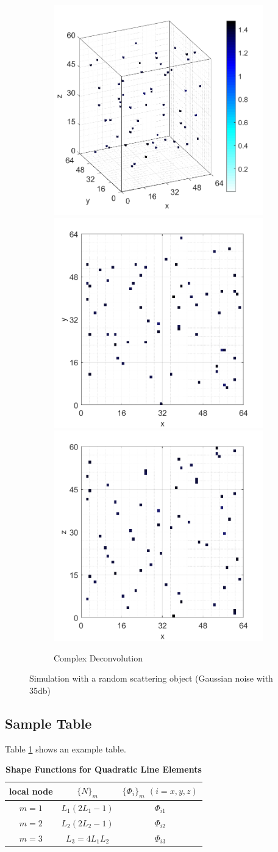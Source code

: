 \documentclass[9pt,twocolumn,twoside]{osajnl}
\begin{document}
\begin{figure}[htbp]
\begin{subfigure}[b]{1\linewidth}
\centering
\includegraphics[width=0.3\linewidth]{random_inline_TwIST_3d}
\includegraphics[width=0.3\linewidth]{random_inline_TwIST_top}
\includegraphics[width=0.3\linewidth]{random_inline_TwIST_side}
\caption{Complex Deconvolution}
\end{subfigure}

\caption{Simulation with a random scattering object (Gaussian noise with 35db)}
\label{fig_sim_random}
\end{figure}

\subsection{Sample Table}

Table \ref{tab:shape-functions} shows an example table.

\begin{table}[htbp]
\centering
\caption{\bf Shape Functions for Quadratic Line Elements}
\begin{tabular}{ccc}
\hline
local node & $\{N\}_m$ & $\{\Phi_i\}_m$ $(i=x,y,z)$ \\
\hline
$m = 1$ & $L_1(2L_1-1)$ & $\Phi_{i1}$ \\
$m = 2$ & $L_2(2L_2-1)$ & $\Phi_{i2}$ \\
$m = 3$ & $L_3=4L_1L_2$ & $\Phi_{i3}$ \\
\hline
\end{tabular}
  \label{tab:shape-functions}
\end{table}
\end{document}
